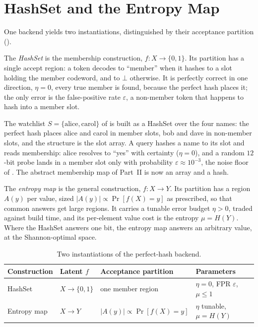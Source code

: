 \section{HashSet and the Entropy Map}
\label{sec:instantiations}

One backend yields two instantiations, distinguished by their acceptance
partition ().

The \emph{HashSet} is the membership construction, $f : X \to \{0, 1\}$. Its
partition has a single accept region: a token decodes to ``member'' when it
hashes to a slot holding the member codeword, and to $\bot$ otherwise. It is
perfectly correct in one direction, $\eta = 0$, every true member is found,
because the perfect hash places it; the only error is the false-positive rate
$\varepsilon$, a non-member token that happens to hash into a member slot.

\begin{example}
\label{ex:watchlist-hashset}
The watchlist $S = \{\mathrm{alice}, \mathrm{carol}\}$ of
 is built as a HashSet over the four names: the
perfect hash places alice and carol in member slots, bob and dave in
non-member slots, and the structure is the slot array. A query hashes a name
to its slot and reads membership: alice resolves to ``yes'' with certainty
($\eta = 0$), and a random $12$-bit probe lands in a member slot only with
probability $\varepsilon \approx 10^{-3}$, the noise floor of
. The abstract membership map of Part~II is now an
array and a hash.
\end{example}

The \emph{entropy map} is the general construction, $f : X \to Y$. Its
partition has a region $A(y)$ per value, sized $\lvert A(y)\rvert \propto
\Pr[f(X) = y]$ as  prescribed, so that common answers
get large regions. It carries a tunable error budget $\eta > 0$, traded
against build time, and its per-element value cost is the entropy $\mu =
H(Y)$. Where the HashSet answers one bit, the entropy map answers an
arbitrary value, at the Shannon-optimal space.

\begin{table}[t]
\centering
\caption{Two instantiations of the perfect-hash backend.}
\label{tab:instantiations}
\begin{tabular}{@{}llll@{}}
\toprule
Construction & Latent $f$ & Acceptance partition & Parameters \\
\midrule
HashSet & $X \to \{0,1\}$ & one member region & $\eta = 0$, FPR $\varepsilon$, $\mu \le 1$ \\
Entropy map & $X \to Y$ & $\lvert A(y)\rvert \propto \Pr[f(X)=y]$ & $\eta$ tunable, $\mu = H(Y)$ \\
\bottomrule
\end{tabular}
\end{table}

